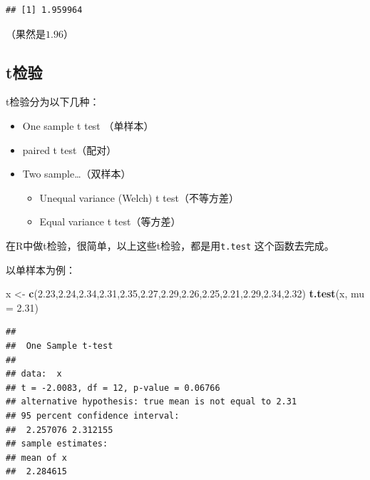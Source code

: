 \documentclass[]{book}
\newenvironment{Shaded}{\begin{snugshade}}{\end{snugshade}}
\newcommand{\DataTypeTok}[1]{\textcolor[rgb]{0.13,0.29,0.53}{#1}}
\newcommand{\FloatTok}[1]{\textcolor[rgb]{0.00,0.00,0.81}{#1}}
\newcommand{\KeywordTok}[1]{\textcolor[rgb]{0.13,0.29,0.53}{\textbf{#1}}}
\newcommand{\NormalTok}[1]{#1}
\newcommand{\StringTok}[1]{\textcolor[rgb]{0.31,0.60,0.02}{#1}}
\providecommand{\tightlist}{%
  \setlength{\itemsep}{0pt}\setlength{\parskip}{0pt}}
\begin{document}
\begin{verbatim}
## [1] 1.959964
\end{verbatim}

（果然是\(1.96\)）

\hypertarget{t}{%
\subsection{t检验}\label{t}}

t检验分为以下几种：

\begin{itemize}
\tightlist
\item
  One sample t test （单样本）
\item
  paired t test（配对）
\item
  Two sample\ldots{}（双样本）

  \begin{itemize}
  \tightlist
  \item
    Unequal variance (Welch) t test（不等方差）
  \item
    Equal variance t test（等方差）
  \end{itemize}
\end{itemize}

在R中做t检验，很简单，以上这些t检验，都是用\texttt{t.test} 这个函数去完成。

以单样本为例：

\begin{Shaded}
\begin{Highlighting}[]
\NormalTok{x <-}\StringTok{ }\KeywordTok{c}\NormalTok{(}\FloatTok{2.23}\NormalTok{,}\FloatTok{2.24}\NormalTok{,}\FloatTok{2.34}\NormalTok{,}\FloatTok{2.31}\NormalTok{,}\FloatTok{2.35}\NormalTok{,}\FloatTok{2.27}\NormalTok{,}\FloatTok{2.29}\NormalTok{,}\FloatTok{2.26}\NormalTok{,}\FloatTok{2.25}\NormalTok{,}\FloatTok{2.21}\NormalTok{,}\FloatTok{2.29}\NormalTok{,}\FloatTok{2.34}\NormalTok{,}\FloatTok{2.32}\NormalTok{)}
\KeywordTok{t.test}\NormalTok{(x, }\DataTypeTok{mu =} \FloatTok{2.31}\NormalTok{)}
\end{Highlighting}
\end{Shaded}

\begin{verbatim}
## 
##  One Sample t-test
## 
## data:  x
## t = -2.0083, df = 12, p-value = 0.06766
## alternative hypothesis: true mean is not equal to 2.31
## 95 percent confidence interval:
##  2.257076 2.312155
## sample estimates:
## mean of x 
##  2.284615
\end{verbatim}
\end{document}
